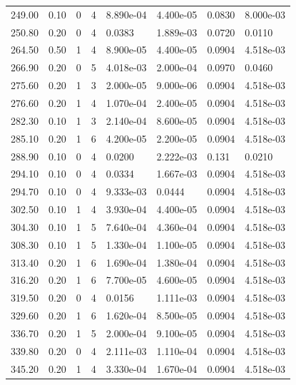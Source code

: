 \documentclass[preview]{standalone}
\begin{document}
{{{\begin{tabular}{L{1.2cm}C{1.2cm} C{0.3cm}C{0.5cm} C{1.4cm}C{1.4cm} C{1.4cm}C{1.4cm}}
  249.00  &  0.10  & 0     &  4 &  8.890e-04  & 4.400e-05  & 0.0830 &  8.000e-03   \\ 
  250.80  &  0.20  & 0     &  4 &  0.0383  & 1.889e-03  & 0.0720 &  0.0110   \\ 
  264.50  &  0.50  & 1     &  4 &  8.900e-05  & 4.400e-05  & 0.0904 &  4.518e-03   \\ 
  266.90  &  0.20  & 0     &  5 &  4.018e-03  & 2.000e-04  & 0.0970 &  0.0460   \\ 
  275.60  &  0.20  & 1     &  3 &  2.000e-05  & 9.000e-06  & 0.0904 &  4.518e-03   \\ 
  276.60  &  0.20  & 1     &  4 &  1.070e-04  & 2.400e-05  & 0.0904 &  4.518e-03   \\ 
  282.30  &  0.10  & 1     &  3 &  2.140e-04  & 8.600e-05  & 0.0904 &  4.518e-03   \\ 
  285.10  &  0.20  & 1     &  6 &  4.200e-05  & 2.200e-05  & 0.0904 &  4.518e-03   \\ 
  288.90  &  0.10  & 0     &  4 &  0.0200  & 2.222e-03  & 0.131 &  0.0210   \\ 
  294.10  &  0.10  & 0     &  4 &  0.0334  & 1.667e-03  & 0.0904 &  4.518e-03   \\ 
  294.70  &  0.10  & 0     &  4 &  9.333e-03  & 0.0444  & 0.0904 &  4.518e-03   \\ 
  302.50  &  0.10  & 1     &  4 &  3.930e-04  & 4.400e-05  & 0.0904 &  4.518e-03   \\ 
  304.30  &  0.10  & 1     &  5 &  7.640e-04  & 4.360e-04  & 0.0904 &  4.518e-03   \\ 
  308.30  &  0.10  & 1     &  5 &  1.330e-04  & 1.100e-05  & 0.0904 &  4.518e-03   \\ 
  313.40  &  0.20  & 1     &  6 &  1.690e-04  & 1.380e-04  & 0.0904 &  4.518e-03   \\ 
  316.20  &  0.20  & 1     &  6 &  7.700e-05  & 4.600e-05  & 0.0904 &  4.518e-03   \\ 
  319.50  &  0.20  & 0     &  4 &  0.0156  & 1.111e-03  & 0.0904 &  4.518e-03   \\ 
  329.60  &  0.20  & 1     &  6 &  1.620e-04  & 8.500e-05  & 0.0904 &  4.518e-03   \\ 
  336.70  &  0.20  & 1     &  5 &  2.000e-04  & 9.100e-05  & 0.0904 &  4.518e-03   \\ 
  339.80  &  0.20  & 0     &  4 &  2.111e-03  & 1.110e-04  & 0.0904 &  4.518e-03   \\ 
  345.20  &  0.20  & 1     &  4 &  3.330e-04  & 1.670e-04  & 0.0904 &  4.518e-03   \\ 

\end{tabular}}}}
\end{document}
